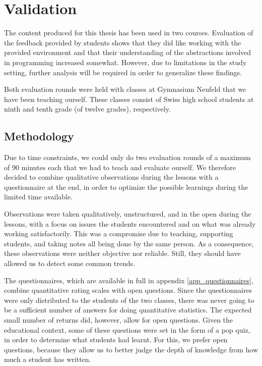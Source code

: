 
\chapter{Validation} \label{ch_practice}

The content produced for this thesis has been used in two courses. Evaluation of the feedback provided by students shows that they did like working with the provided environment and that their understanding of the abstractions involved in programming increased somewhat. However, due to limitations in the study setting, further analysis will be required in order to generalize these findings.

Both evaluation rounds were held with classes at Gymnasium Neufeld that we have been teaching ourself. These classes consist of Swiss high school students at ninth and tenth grade (of twelve grades), respectively.


\section{Methodology}

Due to time constraints, we could only do two evaluation rounds of a maximum of 90 minutes each that we had to teach and evaluate ourself. We therefore decided to combine qualitative observations during the lessons with a questionnaire at the end, in order to optimize the possible learnings during the limited time available.

Observations were taken qualitatively, unstructured, and in the open during the lessons, with a focus on issues the students encountered and on what was already working satisfactorily. This was a compromise due to teaching, supporting students, and taking notes all being done by the same person. As a consequence, these observations were neither objective nor reliable. Still, they should have allowed us to detect some common trends.

The questionnaires, which are available in full in appendix \ref{app_questionnaires}, combine quantitative rating scales with open questions. Since the questionnaires were only distributed to the students of the two classes, there was never going to be a sufficient number of answers for doing quantitative statistics. The expected small number of returns did, however, allow for open questions. Given the educational context, some of these questions were set in the form of a pop quiz, in order to determine what students had learnt. For this, we prefer open questions, because they allow us to better judge the depth of knowledge from how much a student has written.

